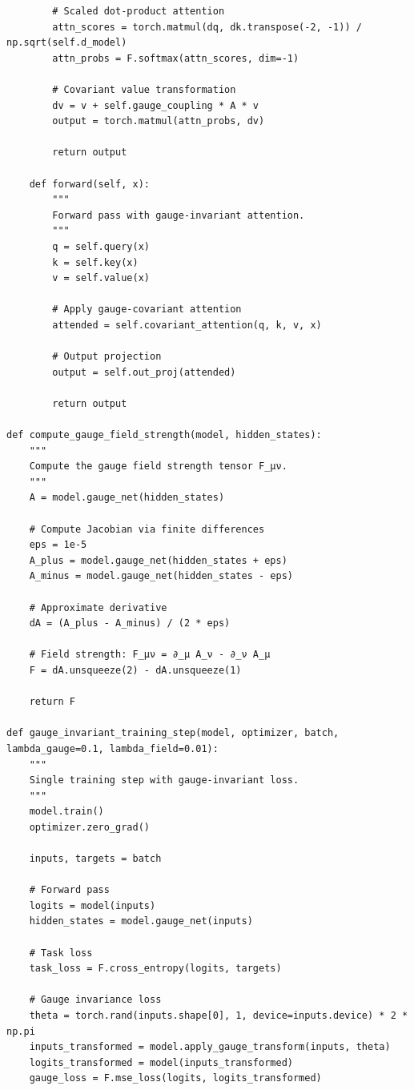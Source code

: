 \documentclass[12pt,letterpaper,twoside]{article}
\begin{document}
\begin{verbatim}
        # Scaled dot-product attention
        attn_scores = torch.matmul(dq, dk.transpose(-2, -1)) / np.sqrt(self.d_model)
        attn_probs = F.softmax(attn_scores, dim=-1)
        
        # Covariant value transformation
        dv = v + self.gauge_coupling * A * v
        output = torch.matmul(attn_probs, dv)
        
        return output
    
    def forward(self, x):
        """
        Forward pass with gauge-invariant attention.
        """
        q = self.query(x)
        k = self.key(x)
        v = self.value(x)
        
        # Apply gauge-covariant attention
        attended = self.covariant_attention(q, k, v, x)
        
        # Output projection
        output = self.out_proj(attended)
        
        return output

def compute_gauge_field_strength(model, hidden_states):
    """
    Compute the gauge field strength tensor F_μν.
    """
    A = model.gauge_net(hidden_states)
    
    # Compute Jacobian via finite differences
    eps = 1e-5
    A_plus = model.gauge_net(hidden_states + eps)
    A_minus = model.gauge_net(hidden_states - eps)
    
    # Approximate derivative
    dA = (A_plus - A_minus) / (2 * eps)
    
    # Field strength: F_μν = ∂_μ A_ν - ∂_ν A_μ
    F = dA.unsqueeze(2) - dA.unsqueeze(1)
    
    return F

def gauge_invariant_training_step(model, optimizer, batch, lambda_gauge=0.1, lambda_field=0.01):
    """
    Single training step with gauge-invariant loss.
    """
    model.train()
    optimizer.zero_grad()
    
    inputs, targets = batch
    
    # Forward pass
    logits = model(inputs)
    hidden_states = model.gauge_net(inputs)
    
    # Task loss
    task_loss = F.cross_entropy(logits, targets)
    
    # Gauge invariance loss
    theta = torch.rand(inputs.shape[0], 1, device=inputs.device) * 2 * np.pi
    inputs_transformed = model.apply_gauge_transform(inputs, theta)
    logits_transformed = model(inputs_transformed)
    gauge_loss = F.mse_loss(logits, logits_transformed)
    

\end{verbatim}
\end{document}
